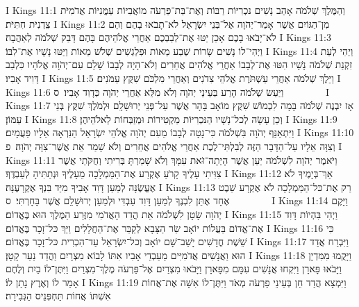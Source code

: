 I Kings 11:1	וְהַמֶּלֶךְ שְׁלֹמֹה אָהַב נָשִׁים נכְרִיּוֹת רַבּוֹת וְאֶת־בַּת־פַּרְעֹה מוֹאֲבִיּוֹת עַמֳּנִיּוֹת אֲדֹמִיֹּת צֵדְנִיֹּת חִתִּיֹּת׃
I Kings 11:2	מִן־הַגּוֹיִם אֲשֶׁר אָמַר־יְהֹוָה אֶל־בְּנֵי יִשְׂרָאֵל לֹא־תָבֹאוּ בָהֶם וְהֵם לֹא־יָבֹאוּ בָכֶם אָכֵן יַטּוּ אֶת־לְבַבְכֶם אַחֲרֵי אֱלֹהֵיהֶם בָּהֶם דָּבַק שְׁלֹמֹה לְאַהֲבָה׃
I Kings 11:3	וַיְהִי־לוֹ נָשִׁים שָׂרוֹת שְׁבַע מֵאוֹת וּפִלַגְשִׁים שְׁלֹשׁ מֵאוֹת וַיַּטּוּ נָשָׁיו אֶת־לִבּוֹ׃
I Kings 11:4	וַיְהִי לְעֵת זִקְנַת שְׁלֹמֹה נָשָׁיו הִטּוּ אֶת־לְבָבוֹ אַחֲרֵי אֱלֹהִים אֲחֵרִים וְלֹא־הָיָה לְבָבוֹ שָׁלֵם עִם־יְהֹוָה אֱלֹהָיו כִּלְבַב דָּוִיד אָבִיו׃
I Kings 11:5	וַיֵּלֶךְ שְׁלֹמֹה אַחֲרֵי עַשְׁתֹּרֶת אֱלֹהֵי צִדֹנִים וְאַחֲרֵי מִלְכֹּם שִׁקֻּץ עַמֹּנִים׃
I Kings 11:6	וַיַּעַשׂ שְׁלֹמֹה הָרַע בְּעֵינֵי יְהֹוָה וְלֹא מִלֵּא אַחֲרֵי יְהֹוָה כְּדָוִד אָבִיו׃ {ס}        
I Kings 11:7	אָז יִבְנֶה שְׁלֹמֹה בָּמָה לִכְמוֹשׁ שִׁקֻּץ מוֹאָב בָּהָר אֲשֶׁר עַל־פְּנֵי יְרוּשָׁלָ͏ִם וּלְמֹלֶךְ שִׁקֻּץ בְּנֵי עַמּוֹן׃
I Kings 11:8	וְכֵן עָשָׂה לְכל־נָשָׁיו הַנּכְרִיּוֹת מַקְטִירוֹת וּמְזַבְּחוֹת לֵאלֹהֵיהֶן׃
I Kings 11:9	וַיִּתְאַנַּף יְהֹוָה בִּשְׁלֹמֹה כִּי־נָטָה לְבָבוֹ מֵעִם יְהֹוָה אֱלֹהֵי יִשְׂרָאֵל הַנִּרְאָה אֵלָיו פַּעֲמָיִם׃
I Kings 11:10	וְצִוָּה אֵלָיו עַל־הַדָּבָר הַזֶּה לְבִלְתִּי־לֶכֶת אַחֲרֵי אֱלֹהִים אֲחֵרִים וְלֹא שָׁמַר אֵת אֲשֶׁר־צִוָּה יְהֹוָה׃ {פ}
I Kings 11:11	וַיֹּאמֶר יְהֹוָה לִשְׁלֹמֹה יַעַן אֲשֶׁר הָיְתָה־זֹּאת עִמָּךְ וְלֹא שָׁמַרְתָּ בְּרִיתִי וְחֻקֹּתַי אֲשֶׁר צִוִּיתִי עָלֶיךָ קָרֹעַ אֶקְרַע אֶת־הַמַּמְלָכָה מֵעָלֶיךָ וּנְתַתִּיהָ לְעַבְדֶּךָ׃
I Kings 11:12	אַךְ־בְּיָמֶיךָ לֹא אֶעֱשֶׂנָּה לְמַעַן דָּוִד אָבִיךָ מִיַּד בִּנְךָ אֶקְרָעֶנָּה׃
I Kings 11:13	רַק אֶת־כּל־הַמַּמְלָכָה לֹא אֶקְרָע שֵׁבֶט אֶחָד אֶתֵּן לִבְנֶךָ לְמַעַן דָּוִד עַבְדִּי וּלְמַעַן יְרוּשָׁלַ͏ִם אֲשֶׁר בָּחָרְתִּי׃ {ס}        
I Kings 11:14	וַיָּקֶם יְהֹוָה שָׂטָן לִשְׁלֹמֹה אֵת הֲדַד הָאֲדֹמִי מִזֶּרַע הַמֶּלֶךְ הוּא בֶּאֱדוֹם׃
I Kings 11:15	וַיְהִי בִּהְיוֹת דָּוִד אֶת־אֱדוֹם בַּעֲלוֹת יוֹאָב שַׂר הַצָּבָא לְקַבֵּר אֶת־הַחֲלָלִים וַיַּךְ כּל־זָכָר בֶּאֱדוֹם׃
I Kings 11:16	כִּי שֵׁשֶׁת חֳדָשִׁים יָשַׁב־שָׁם יוֹאָב וְכל־יִשְׂרָאֵל עַד־הִכְרִית כּל־זָכָר בֶּאֱדוֹם׃
I Kings 11:17	וַיִּבְרַח אֲדַד הוּא וַאֲנָשִׁים אֲדֹמִיִּים מֵעַבְדֵי אָבִיו אִתּוֹ לָבוֹא מִצְרָיִם וַהֲדַד נַעַר קָטָן׃
I Kings 11:18	וַיָּקֻמוּ מִמִּדְיָן וַיָּבֹאוּ פָּארָן וַיִּקְחוּ אֲנָשִׁים עִמָּם מִפָּארָן וַיָּבֹאוּ מִצְרַיִם אֶל־פַּרְעֹה מֶלֶךְ־מִצְרַיִם וַיִּתֶּן־לוֹ בַיִת וְלֶחֶם אָמַר לוֹ וְאֶרֶץ נָתַן לוֹ׃
I Kings 11:19	וַיִּמְצָא הֲדַד חֵן בְּעֵינֵי פַרְעֹה מְאֹד וַיִּתֶּן־לוֹ אִשָּׁה אֶת־אֲחוֹת אִשְׁתּוֹ אֲחוֹת תַּחְפְּנֵיס הַגְּבִירָה׃
